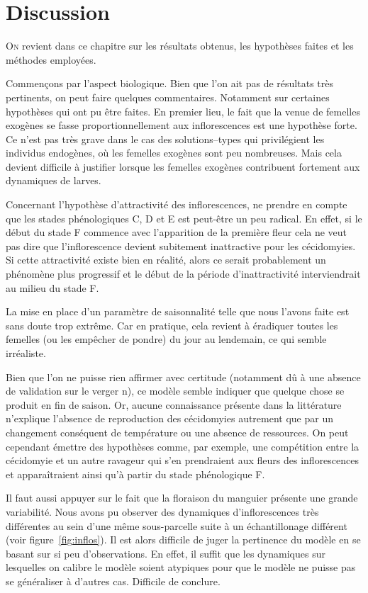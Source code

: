 \chapter{Discussion} 

\lettrine{O}{n} revient dans ce chapitre sur les résultats obtenus, les hypothèses faites et les méthodes employées.

Commençons par l'aspect biologique.
Bien que l'on ait pas de résultats très pertinents, on peut faire quelques commentaires.
Notamment sur certaines hypothèses qui ont pu être faites.
En premier lieu, le fait que la venue de femelles exogènes se fasse proportionnellement aux inflorescences est une hypothèse forte.
Ce n'est pas très grave dans le cas des solutions--types qui privilégient les individus endogènes, où les femelles exogènes sont peu nombreuses.
Mais cela devient difficile à justifier lorsque les femelles exogènes contribuent fortement aux dynamiques de larves.

Concernant l'hypothèse d'attractivité des inflorescences, ne prendre en compte que les stades phénologiques C, D et E est peut-être un peu radical.
En effet, si le début du stade F commence avec l'apparition de la première fleur cela ne veut pas dire que l'inflorescence devient subitement inattractive pour les cécidomyies.
Si cette attractivité existe bien en réalité, alors ce serait probablement un phénomène plus progressif et le début de la période d'inattractivité interviendrait au milieu du stade F.

La mise en place d'un paramètre de saisonnalité telle que nous l'avons faite est sans doute trop extrême.
Car en pratique, cela revient à éradiquer toutes les femelles (ou les empêcher de pondre) du jour au lendemain, ce qui semble irréaliste.

Bien que l'on ne puisse rien affirmer avec certitude (notamment dû à une absence de validation sur le verger n), ce modèle semble indiquer que quelque chose se produit en fin de saison.
Or, aucune connaissance présente dans la littérature n'explique l'absence de reproduction des cécidomyies autrement que par un changement conséquent de température ou une absence de ressources.
On peut cependant émettre des hypothèses comme, par exemple, une compétition entre la cécidomyie et un autre ravageur qui s'en prendraient aux fleurs des inflorescences et apparaîtraient ainsi qu'à partir du stade phénologique F.

Il faut aussi appuyer sur le fait que la floraison du manguier présente une grande variabilité.
Nous avons pu observer des dynamiques d'inflorescences très différentes au sein d'une même sous-parcelle suite à un échantillonage différent (voir figure~\ref{fig:inflos}).
Il est alors difficile de juger la pertinence du modèle en se basant sur si peu d'observations.
En effet, il suffit que les dynamiques sur lesquelles on calibre le modèle soient atypiques pour que le modèle ne puisse pas se généraliser à d'autres cas.
Difficile de conclure.

